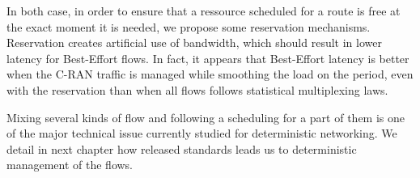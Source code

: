 In both case, in order to ensure that a ressource scheduled for a route is free at the exact moment it is needed, we propose some reservation mechanisms. Reservation creates artificial use of bandwidth, which should result in lower latency for Best-Effort flows. In fact, it appears that Best-Effort latency is better when the C-RAN traffic is managed while smoothing the load on the period, even with the reservation than when all flows follows statistical multiplexing laws.

Mixing several kinds of flow and following a scheduling for a part of them is one of the major technical issue currently studied for deterministic networking. We detail in next chapter how released standards leads us to deterministic management of the flows.
